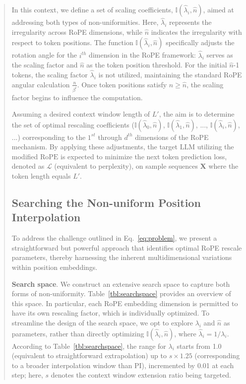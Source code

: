 \begin{abstract}
In this context, we define a set of scaling coefficients, $\mathbb{I}(\hat{\lambda}_{i},\hat{n})$, aimed at addressing both types of non-uniformities. Here, $\hat{\lambda}_i$ represents the irregularity across RoPE dimensions, while $\hat{n}$ indicates the irregularity with respect to token positions. The function $\mathbb{I}(\hat{\lambda}_{i},\hat{n})$ specifically adjusts the rotation angle for the $i^{th}$ dimension in the RoPE framework: $\hat{\lambda}_i$ serves as the scaling factor and $\hat{n}$ as the token position threshold. For the initial $\hat{n}$-1 tokens, the scaling factor $\hat{\lambda}_i$ is not utilized, maintaining the standard RoPE angular calculation $\frac{n}{\beta^i}$. Once token positions satisfy $n\ge\hat{n}$, the scaling factor begins to influence the computation.

Assuming a desired context window length of $L'$, the aim is to determine the set of optimal rescaling coefficients ($\mathbb{I}(\hat{\lambda}_{0},\hat{n})$, $\mathbb{I}(\hat{\lambda}_{1},\hat{n})$, ..., $\mathbb{I}(\hat{\lambda}_{i},\hat{n})$, ...) corresponding to the $1^{st}$ through $d^{th}$ dimensions of the RoPE mechanism. By applying these adjustments, the target $\text{LLM}$ utilizing the modified $\text{RoPE}$ is expected to minimize the next token prediction loss, denoted as $\mathcal{L}$ (equivalent to perplexity), on sample sequences $\mathbf{X}$ where the token length equals $L'$.

\subsection{Searching the Non-uniform Position Interpolation}

To address the challenge outlined in Eq.~\ref{eq:problem}, we present a straightforward but powerful approach that identifies optimal RoPE rescale parameters, thereby harnessing the inherent multidimensional variations within position embeddings.

\textbf{Search space}. We construct an extensive search space to capture both forms of non-uniformity. Table~\ref{tbl:searchspace} provides an overview of this space. In particular, each RoPE embedding dimension is permitted to have its own rescaling factor, which is individually optimized. To streamline the design of the search space, we opt to explore $\lambda_i$ and $\hat{n}$ as parameters, rather than directly optimizing $\mathbb{I}(\hat{\lambda}_{i},\hat{n})$, where $\hat{\lambda}_{i}=1/\lambda_i$. 
According to Table~\ref{tbl:searchspace}, the range for $\lambda_i$ starts from 1.0 (equivalent to straightforward extrapolation) up to $s\times1.25$ (corresponding to a broader interpolation window than PI), incremented by 0.01 at each step; here, $s$ denotes the context window extension ratio being targeted.


\end{abstract}
